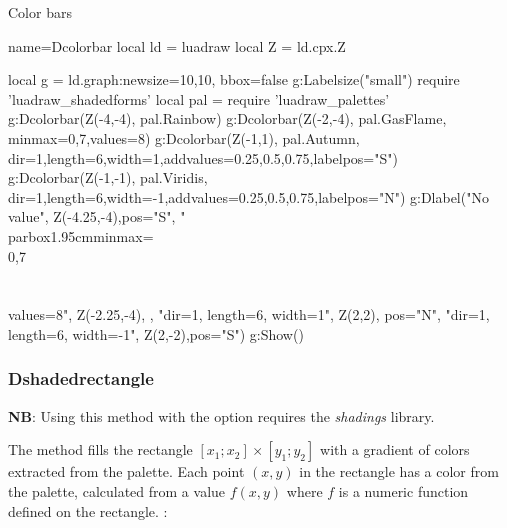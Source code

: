 \begin{demo}{Color bars}
\begin{luadraw}{name=Dcolorbar}
local ld = luadraw
local Z = ld.cpx.Z

local g = ld.graph:new{size={10,10}, bbox=false}
g:Labelsize("small")
require 'luadraw_shadedforms'
local pal = require 'luadraw_palettes'
g:Dcolorbar(Z(-4,-4), pal.Rainbow)
g:Dcolorbar(Z(-2,-4), pal.GasFlame, {minmax={0,7},values=8})
g:Dcolorbar(Z(-1,1), pal.Autumn, {dir=1,length=6,width=1,addvalues={0.25,0.5,0.75},labelpos="S"})
g:Dcolorbar(Z(-1,-1), pal.Viridis, {dir=1,length=6,width=-1,addvalues={0.25,0.5,0.75},labelpos="N"})
g:Dlabel("No value", Z(-4.25,-4),{pos="S"},
    "\\parbox{1.95cm}{minmax=\\{0,7\\}\\\\values=8}", Z(-2.25,-4), {},
    "dir=1, length=6, width=1", Z(2,2), {pos="N"},
    "dir=1, length=6, width=-1", Z(2,-2),{pos="S"})
g:Show()
\end{luadraw}
\end{demo}

\subsubsection{Dshadedrectangle}

\noindent\textbf{NB}: Using this method with the  option requires the \emph{shadings} library.

The  method fills the rectangle $[x_1;x_2]\times [y_1;y_2]$ with a gradient of colors extracted from the  palette. Each point $(x,y)$ in the rectangle has a color from the palette, calculated from a value $f(x,y)$ where $f$ is a numeric function defined on the rectangle. \writeoptions:

